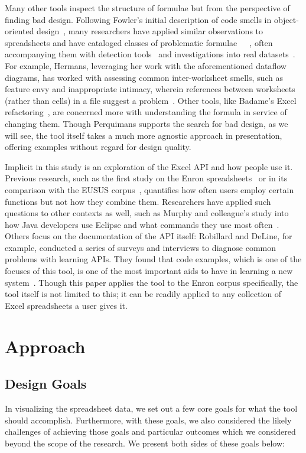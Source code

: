 \documentclass[conference]{IEEEtran}
\newcommand{\toolname}{Perquimans\xspace} \newcommand{\toolnameend}{Perquimans}
\begin{document}
	Many other tools inspect the structure of formulae but from the
	perspective of finding bad design.  Following Fowler's initial description of
	code smells in object-oriented design~\cite{fowler2009refactoring}, many
	researchers have applied similar observations to spreadsheets and have
	cataloged classes of problematic
	formulae~\cite{hermans2012detecting}~\cite{cunha2012towards}~\cite{asavametha2012detecting}, often accompanying them with detection tools~\cite{abreu2014smelling} and investigations into real datasets~\cite{jansen2015code}. For example, Hermans, leveraging her work with the aforementioned dataflow diagrams, has worked with assessing common inter-worksheet smells, such as feature envy and inappropriate intimacy, wherein references between worksheets (rather than cells) in a file suggest a problem~\cite{hermans2012detectinginter}. Other tools, like Badame's Excel refactoring~\cite{badame2012refactoring}, are concerned more with understanding the formula in service of changing them. Though \toolname supports the search for bad design, as we will see, the tool itself takes a much more agnostic approach in presentation, offering examples without regard for design quality.

	Implicit in this study is an exploration of the Excel API and how people use
	it. Previous research, such as the first study on the Enron
	spreadsheets~\cite{hermans2015enron} or in its comparison with the EUSUS
	corpus~\cite{jansen2015enron}, quantifies how often users employ certain
	functions but not how they combine them. Researchers have applied such
	questions to other contexts as well, such as Murphy and colleague's study into
	how Java developers use Eclipse and what commands they use most
	often~\cite{murphy2006java}. Others focus on the documentation of the API
	itself: Robillard and DeLine, for example, conducted a series of surveys and
	interviews to diagnose common problems with learning APIs. They found that
	code examples, which is one of the focuses of this tool, is one of the most important
	aids to have in learning a new system~\cite{robillard2011field}. Though this
	paper applies the tool to the Enron corpus specifically, the tool itself is not
	limited to this; it can be readily applied to any collection of Excel
	spreadsheets a user gives it.
	
	\section{Approach}
	
	\subsection{Design Goals} \label{goals} In visualizing the spreadsheet data, we
	set out a few core goals for what the tool should accomplish. Furthermore, with
	these goals, we also considered the likely challenges of achieving those goals
	and particular outcomes which we considered beyond the scope of the research.
	We present both sides of these goals below:
	
\end{document}
